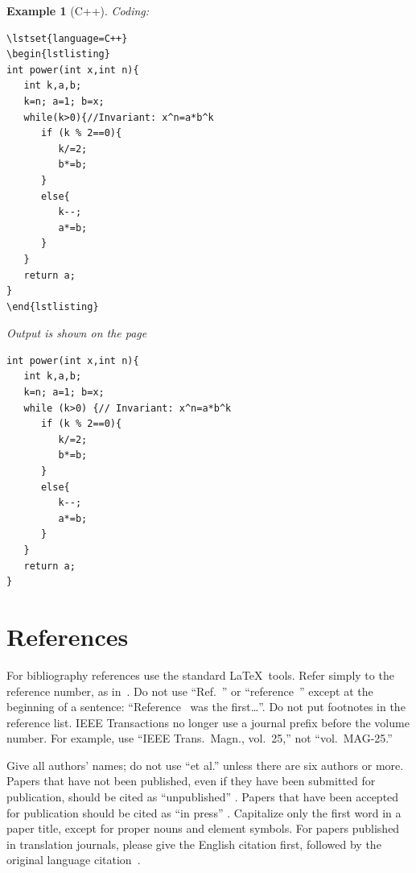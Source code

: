 \documentclass[a4paper,conference]{IEEEtran}
\newtheorem{example}[remark]{Example}
\begin{document}
\begin{example}[C++]
Coding:
\begin{verbatim}
\lstset{language=C++}
\begin{lstlisting}
int power(int x,int n){
   int k,a,b;
   k=n; a=1; b=x;
   while(k>0){//Invariant: x^n=a*b^k
      if (k % 2==0){
         k/=2;
         b*=b;
      }
      else{
         k--;
         a*=b;
      }
   }
   return a;
}
\end{lstlisting}
\end{verbatim}
Output is shown on the page~\pageref{c++}
\begin{algorithm}[tbp]
\caption{Calculating $x$ to the 
power~$n$ in C++\label{c++}}
\lstset{language=C++}
\begin{lstlisting}
int power(int x,int n){
   int k,a,b;
   k=n; a=1; b=x;
   while (k>0) {// Invariant: x^n=a*b^k
      if (k % 2==0){
         k/=2;
         b*=b;
      }
      else{
         k--;
         a*=b;
      }
   }
   return a;
}
\end{lstlisting}
\end{algorithm}
\end{example}



\section{References}
For bibliography references use the standard \LaTeX\ tools. Refer simply to the reference number, as in~\cite{c3}. Do not use ``Ref.~\cite{c3}'' or ``reference~\cite{c3}'' except at the beginning of a sentence:  ``Reference~\cite{c3} was the first\dots''. Do not put footnotes in the reference list. IEEE Transactions no longer use a journal prefix before the volume number.  For example, use ``IEEE Trans.\ Magn., vol.~25,'' not ``vol.~MAG-25.''

Give all authors' names; do not use ``et al.'' unless there are six authors or more.  Papers that have not been published, even if they have been submitted for publication, should be cited as ``unpublished'' \cite{cu}.  Papers that have been accepted for publication should be cited as ``in press'' \cite{cin}.  Capitalize only the first word in a paper title, except for proper nouns and element symbols.
For papers published in translation journals, please give the English citation first, followed by the original language citation~\cite{ctr}.

\balance
\end{document}
